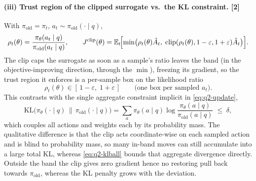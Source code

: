 \documentclass[11pt,a4paper]{article}
\begin{document}
\paragraph{(iii) Trust region of the clipped surrogate vs.\ the KL constraint. \hfill\textnormal{[2]}}
With $\pi_{\mathrm{old}}=\pi_t$, $a_t\sim\pi_{\mathrm{old}}(\cdot\mid q)$,
\begin{equation}
  \rho_t(\theta)=\frac{\pi_\theta(a_t\mid q)}{\pi_{\mathrm{old}}(a_t\mid q)},
  \qquad
  J^{\mathrm{clip}}(\theta)=\mathbb{E}_t\!\Bigl[\min\bigl(\rho_t(\theta)\hat A_t,\;
  \mathrm{clip}(\rho_t(\theta),1-\varepsilon,1+\varepsilon)\hat A_t\bigr)\Bigr].
  \label{eq:q2-clip}
\end{equation}
The clip caps the surrogate as soon as a sample's ratio leaves the band (in the objective-improving
direction, through the $\min$), freezing its gradient, so the trust region it enforces is a per-sample
box on the likelihood ratio
\begin{equation}
  \rho_t(\theta)\in[\,1-\varepsilon,\;1+\varepsilon\,]\qquad\text{(one box per sampled }a_t).
  \label{eq:q2-clipband}
\end{equation}
This contrasts with the single aggregate constraint implicit in \eqref{eq:q2-update},
\begin{equation}
  \mathrm{KL}\bigl(\pi_\theta(\cdot\mid q)\,\|\,\pi_{\mathrm{old}}(\cdot\mid q)\bigr)
  =\sum_a \pi_\theta(a\mid q)\log\frac{\pi_\theta(a\mid q)}{\pi_{\mathrm{old}}(a\mid q)}\;\le\;\delta ,
  \label{eq:q2-klball}
\end{equation}
which couples all actions and weights each by its probability mass. The qualitative difference is that
the clip acts coordinate-wise on each sampled action and is blind to probability mass, so many in-band
moves can still accumulate into a large total KL, whereas \eqref{eq:q2-klball} bounds that aggregate
divergence directly. Outside the band the clip gives zero gradient hence no restoring pull back
towards $\pi_{\mathrm{old}}$, whereas the KL penalty grows with the deviation.

\newpage
\end{document}
